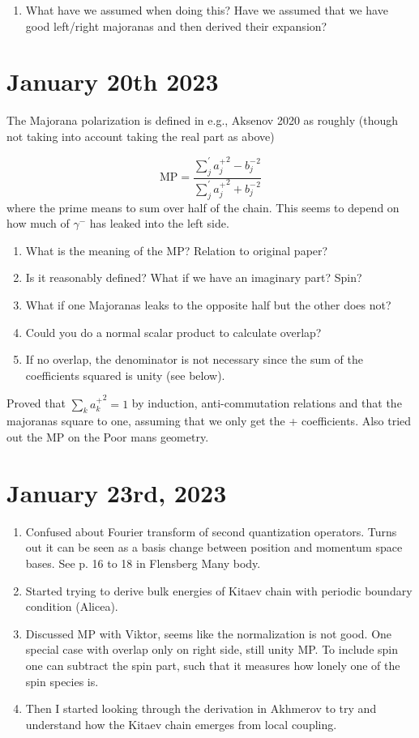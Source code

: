 \documentclass{article}
\begin{document}
\begin{enumerate}
    \item What have we assumed when doing this? Have we assumed that we have good left/right majoranas and then derived their expansion?
\end{enumerate}

\section*{January 20th 2023}
The Majorana polarization is defined in e.g., Aksenov 2020 as roughly (though not taking into account taking the real part as above)

\begin{equation}
    \text{MP} = \frac{\sum_j^{'} {a_j^+}^2 - {b_j^-}^2}{\sum_j^{'} {a_j^+}^2 + {b_j^-}^2}
\end{equation}
where the prime means to sum over half of the chain. This seems to depend on how much of $\gamma^-$ has leaked into the left side. 

\begin{enumerate}
    \item What is the meaning of the MP\@? Relation to original paper?
    \item Is it reasonably defined? What if we have an imaginary part? Spin?
    \item What if one Majoranas leaks to the opposite half but the other does not?
    \item Could you do a normal scalar product to calculate overlap?
    \item If no overlap, the denominator is not necessary since the sum of the coefficients squared is unity (see below).
\end{enumerate}
Proved that $\sum_k {a_k^+}^2 = 1$ by induction, anti-commutation relations and that the majoranas square to one, assuming that we only get the + coefficients. Also tried out the MP on the Poor mans geometry.
\section*{January 23rd, 2023}
\begin{enumerate}
    \item Confused about Fourier transform of second quantization operators. Turns out it can be seen as a basis change between position and momentum space bases. See p. 16 to 18 in Flensberg Many body.
    \item Started trying to derive bulk energies of Kitaev chain with periodic boundary condition (Alicea).
    \item Discussed MP with Viktor, seems like the normalization is not good. One special case with overlap only on right side, still unity MP\@. To include spin one can subtract the spin part, such that it measures how lonely one of the spin species is. 
    \item Then I started looking through the derivation in Akhmerov to try and understand how the Kitaev chain emerges from local coupling.
\end{enumerate}
\end{document}
